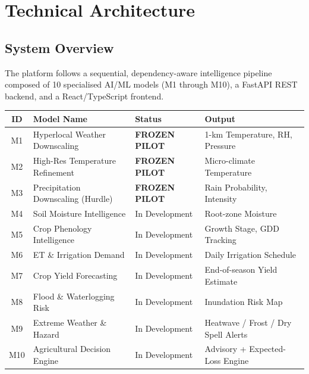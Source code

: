 \documentclass[12pt,a4paper]{article}
\begin{document}
\section{Technical Architecture}

\subsection{System Overview}

The platform follows a sequential, dependency-aware intelligence pipeline composed of 10 specialised AI/ML models (M1 through M10), a FastAPI REST backend, and a React/TypeScript frontend.

\begin{center}
\small
\begin{tabular}{|c|p{5.2cm}|p{2.5cm}|p{3.5cm}|}
\hline
\rowcolor{primaryGreen}
\textbf{\color{white}ID} & \textbf{\color{white}Model Name} & \textbf{\color{white}Status} & \textbf{\color{white}Output} \\
\hline
M1 & Hyperlocal Weather Downscaling & \textcolor{primaryGreen}{\textbf{FROZEN PILOT}} & 1-km Temperature, RH, Pressure \\
\hline
M2 & High-Res Temperature Refinement & \textcolor{primaryGreen}{\textbf{FROZEN PILOT}} & Micro-climate Temperature \\
\hline
M3 & Precipitation Downscaling (Hurdle) & \textcolor{primaryGreen}{\textbf{FROZEN PILOT}} & Rain Probability, Intensity \\
\hline
M4 & Soil Moisture Intelligence & \textcolor{pilotBlue}{In Development} & Root-zone Moisture \\
\hline
M5 & Crop Phenology Intelligence & \textcolor{pilotBlue}{In Development} & Growth Stage, GDD Tracking \\
\hline
M6 & ET \& Irrigation Demand & \textcolor{pilotBlue}{In Development} & Daily Irrigation Schedule \\
\hline
M7 & Crop Yield Forecasting & \textcolor{pilotBlue}{In Development} & End-of-season Yield Estimate \\
\hline
M8 & Flood \& Waterlogging Risk & \textcolor{pilotBlue}{In Development} & Inundation Risk Map \\
\hline
M9 & Extreme Weather \& Hazard & \textcolor{pilotBlue}{In Development} & Heatwave / Frost / Dry Spell Alerts \\
\hline
M10 & Agricultural Decision Engine & \textcolor{pilotBlue}{In Development} & Advisory + Expected-Loss Engine \\
\hline
\end{tabular}
\end{center}
\end{document}
